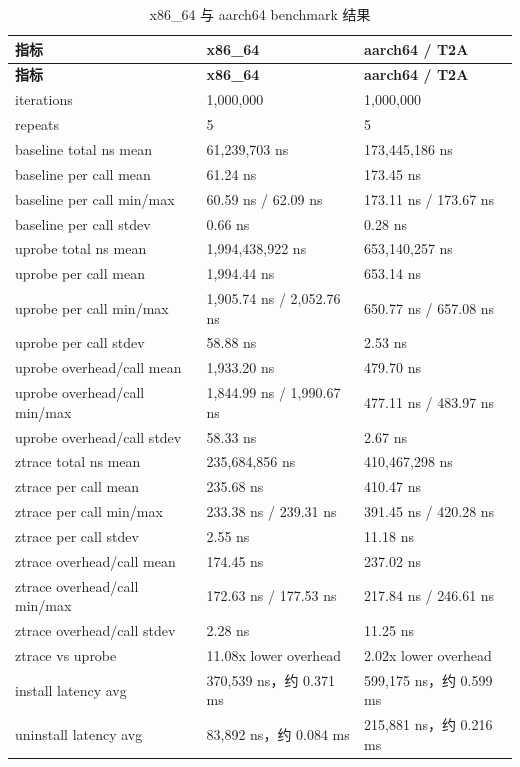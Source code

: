 \documentclass[UTF8,a4paper,11pt,fontset=fandol]{ctexart}
\begin{document}
\begin{longtable}{@{}P{4.9cm}P{5.0cm}P{5.0cm}@{}}
\caption{x86\_64 与 aarch64 benchmark 结果}
\label{tab:benchmark}\\
\toprule
\textbf{指标} & \textbf{x86\_64} & \textbf{aarch64 / T2A}\\
\midrule
\endfirsthead
\toprule
\textbf{指标} & \textbf{x86\_64} & \textbf{aarch64 / T2A}\\
\midrule
\endhead
iterations & 1,000,000 & 1,000,000\\
repeats & 5 & 5\\
baseline total ns mean & 61,239,703 ns & 173,445,186 ns\\
baseline per call mean & 61.24 ns & 173.45 ns\\
baseline per call min/max & 60.59 ns / 62.09 ns & 173.11 ns / 173.67 ns\\
baseline per call stdev & 0.66 ns & 0.28 ns\\
uprobe total ns mean & 1,994,438,922 ns & 653,140,257 ns\\
uprobe per call mean & 1,994.44 ns & 653.14 ns\\
uprobe per call min/max & 1,905.74 ns / 2,052.76 ns & 650.77 ns / 657.08 ns\\
uprobe per call stdev & 58.88 ns & 2.53 ns\\
uprobe overhead/call mean & 1,933.20 ns & 479.70 ns\\
uprobe overhead/call min/max & 1,844.99 ns / 1,990.67 ns & 477.11 ns / 483.97 ns\\
uprobe overhead/call stdev & 58.33 ns & 2.67 ns\\
ztrace total ns mean & 235,684,856 ns & 410,467,298 ns\\
ztrace per call mean & 235.68 ns & 410.47 ns\\
ztrace per call min/max & 233.38 ns / 239.31 ns & 391.45 ns / 420.28 ns\\
ztrace per call stdev & 2.55 ns & 11.18 ns\\
ztrace overhead/call mean & 174.45 ns & 237.02 ns\\
ztrace overhead/call min/max & 172.63 ns / 177.53 ns & 217.84 ns / 246.61 ns\\
ztrace overhead/call stdev & 2.28 ns & 11.25 ns\\
ztrace vs uprobe & 11.08x lower overhead & 2.02x lower overhead\\
install latency avg & 370,539 ns，约 0.371 ms & 599,175 ns，约 0.599 ms\\
uninstall latency avg & 83,892 ns，约 0.084 ms & 215,881 ns，约 0.216 ms\\
\bottomrule
\end{longtable}
\end{document}
